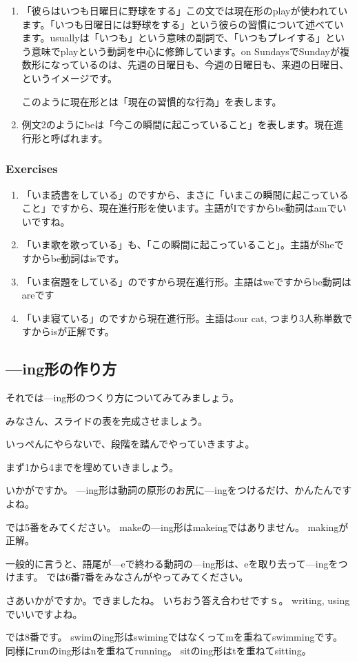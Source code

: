 \documentclass[book,jafontscale=0.9247]{jlreq}
\begin{document}
\begin{enumerate}
 \item 「彼らはいつも日曜日に野球をする」この文では現在形のplayが使われています。「いつも日曜日には野球をする」という彼らの習慣について述べています。usuallyは「いつも」という意味の副詞で、「いつもプレイする」という意味でplayという動詞を中心に修飾しています。on SundaysでSundayが複数形になっているのは、先週の日曜日も、今週の日曜日も、来週の日曜日、というイメージです。

このように現在形とは「現在の習慣的な行為」を表します。
 \item 例文2のようにbeは「今この瞬間に起こっていること」を表します。現在進行形と呼ばれます。
\end{enumerate}

\subsubsection{Exercises}
\begin{enumerate}
 \item 「いま読書をしている」のですから、まさに「いまこの瞬間に起こっていること」ですから、現在進行形を使います。主語がIですからbe動詞はamでいいですね。
 \item 「いま歌を歌っている」も、「この瞬間に起こっていること」。主語がSheですからbe動詞はisです。
 \item 「いま宿題をしている」のですから現在進行形。主語はweですからbe動詞はareです
 \item 「いま寝ている」のですから現在進行形。主語はour cat, つまり3人称単数ですからisが正解です。
\end{enumerate}

\subsection{---ing形の作り方}

それでは---ing形のつくり方についてみてみましょう。

みなさん、スライドの表を完成させましょう。

いっぺんにやらないで、段階を踏んでやっていきますよ。

まず1から4までを埋めていきましょう。

いかがですか。
---ing形は動詞の原形のお尻に---ingをつけるだけ、かんたんですよね。

では5番をみてください。
makeの---ing形はmakeingではありません。
makingが正解。

一般的に言うと、語尾が---eで終わる動詞の---ing形は、eを取り去って---ingをつけます。
では6番7番をみなさんがやってみてください。

さあいかがですか。できましたね。
いちおう答え合わせですｓ。
writing, usingでいいですよね。

では8番です。
swimのing形はswimingではなくってmを重ねてswimmingです。
同様にrunのing形はnを重ねてrunning。
sitのing形はtを重ねてsitting。
\end{document}
